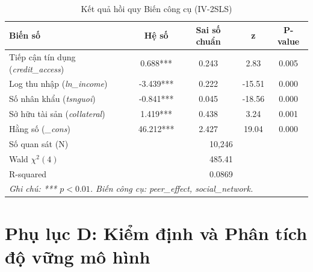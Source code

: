 \documentclass[12pt,a4paper]{report}
\begin{document}
\begin{table}[htbp]
	\centering
	\caption{Kết quả hồi quy Biến công cụ (IV-2SLS)}
	\label{tab:appendix_c_2sls}
	\begin{tabular}{lcccc}
		\toprule
		\textbf{Biến số} & \textbf{Hệ số} & \textbf{Sai số chuẩn} & \textbf{z} & \textbf{P-value} \\
		\midrule
		Tiếp cận tín dụng (\textit{credit\_access}) & 0.688*** & 0.243 & 2.83 & 0.005 \\
		Log thu nhập (\textit{ln\_income}) & -3.439*** & 0.222 & -15.51 & 0.000 \\
		Số nhân khẩu (\textit{tsnguoi}) & -0.841*** & 0.045 & -18.56 & 0.000 \\
		Sở hữu tài sản (\textit{collateral}) & 1.419*** & 0.438 & 3.24 & 0.001 \\
		Hằng số (\textit{\_cons}) & 46.212*** & 2.427 & 19.04 & 0.000 \\
		\midrule
		Số quan sát (N) & \multicolumn{4}{c}{10,246} \\
		Wald $\chi^2(4)$ & \multicolumn{4}{c}{485.41} \\
		R-squared & \multicolumn{4}{c}{0.0869} \\
		\bottomrule
		\multicolumn{5}{l}{\footnotesize \textit{Ghi chú: *** $p<0.01$. Biến công cụ: peer\_effect, social\_network.}}
	\end{tabular}
\end{table}

\newpage	
\section*{Phụ lục D: Kiểm định và Phân tích độ vững mô hình}
\end{document}
